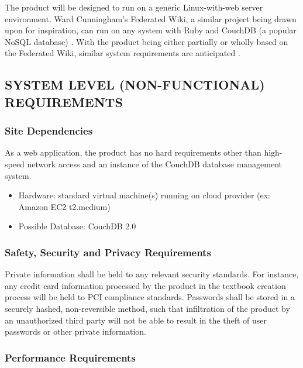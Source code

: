 \documentclass[letterpaper, 10pt, draftclsnofoot, compsoc, onecolumn]{IEEEtran}
\begin{document}
{\noindent
The product will be designed to run on a generic Linux-with-web server environment.
Ward Cunningham's Federated Wiki, a similar project being drawn upon for inspiration, can run
on any system with Ruby and CouchDB (a popular NoSQL database) \cite{Federated}. 
With the product being either partially or wholly based on the Federated Wiki, similar system
requirements are anticipated \cite{Federated}.

\subsection[SYSTEM LEVEL (NON{}-FUNCTIONAL) REQUIREMENTS]{\rmfamily\bfseries\color{black} SYSTEM LEVEL (NON-FUNCTIONAL) REQUIREMENTS}


\subsubsection[Site Dependencies]{\rmfamily\bfseries\color{black} Site Dependencies}
As a web application, the product has no hard requirements other than high-speed
network access and an instance of the CouchDB database management system.
\begin{itemize}
  \item Hardware: standard virtual machine(s) running on cloud provider (ex: Amazon EC2 
  t2.medium)
  \item Possible Database: CouchDB 2.0
\end{itemize}

\subsubsection[Safety, Security and Privacy Requirements]{\rmfamily\bfseries\color{black} Safety, Security and Privacy Requirements}

{\noindent 
Private information shall be held to any relevant security standards. For instance,
any credit card information processed by the product in the textbook creation process
will be held to PCI compliance standards. Passwords shall be stored in a securely hashed,
non-reversible method, such that infiltration of the product by an unauthorized
third party will not be able to result in the theft of user passwords or other private
information.}

\subsubsection[Performance Requirements]{\rmfamily\bfseries\color{black} Performance Requirements}

}
\end{document}
